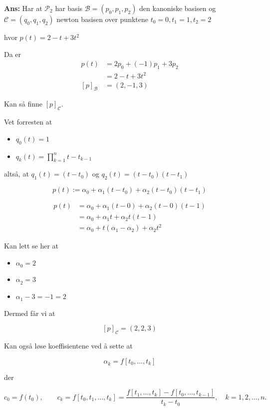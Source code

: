 \documentclass[11pt]{article}
\newenvironment{solbox}
  {\begin{mdframed}[linewidth=1pt,linecolor=black,roundcorner=5pt]
   \noindent\textbf{Ans: }\enspace}
  {\end{mdframed}}
\begin{document}
\begin{solbox}
Har at $ \mathcal{P}_2 $ har basis $ \mathcal{B} = (p_0, p_1,p_2)$ den kanoniske basisen og $ \mathcal{C}=(q_0,q_1,q_2) $ newton basisen over punktene $ t_0=0,t_1=1,t_2=2 $

hvor $ p(t)=2-t+3t^2 $ 

Da er 
\begin{align*}
    p(t) &=2p_0 + (-1)p_1+3p_2 \\
    &= 2-t+3t^2 \\
    \left[ p \right]_{\mathcal{B}} &= (2,-1,3)
\end{align*}

Kan så finne $ \left[ p \right] _{\mathcal{C}} $. 

Vet forresten at 
\begin{itemize}
  \item $ q_0(t) = 1  $
  \item $ q_k(t) = \prod_{k=1}^n t-t_{k-1} $  
\end{itemize}

altså, at $ q_1(t) = \left( t-t_0 \right)  $ og $ q_2(t) = \left( t-t_0 \right) \left( t-t_1 \right)  $ 

\[
   p(t):= \alpha_{0}^{} + \alpha_{1}^{} \left( t-t_0 \right) + \alpha_{2}^{} \left( t-t_0 \right) \left( t-t_1 \right) 
\] 

\begin{align*}
  p(t) &= \alpha_{0}^{} + \alpha_{1}^{}  \left( t-0 \right) + \alpha_{2}^{} \left( t-0 \right) \left( t-1 \right)  \\
  &= \alpha_{0}^{} + \alpha_{1}^{} t + \alpha_{2}^{} t(t-1) \\
  &= \alpha_{0}^{} + t \left( \alpha_{1}^{} - \alpha_{2}^{}  \right) + \alpha_{2}^{} t^2 
\end{align*}

Kan lett se her at 

\begin{itemize}
  \item $\alpha_{0}^{} =2$
  \item $\alpha_{2}^{} =3$
  \item $\alpha_{1}^{} - 3 =-1 = 2$
\end{itemize}

Dermed får vi at 

\[
   \left[ p \right] _{\mathcal{C}} = \left( 2,2,3 \right) 
\] 

Kan også løse koeffisientene ved å sette at 

\[
   \alpha_{k}^{} = f \left[ t_0,..., t_k \right]
\] 

der 

\[
c_0 = f(t_0),
\qquad
c_k = f[t_0, t_1, \dots, t_k]
= \frac{ f[t_1, \dots, t_k] - f[t_0, \dots, t_{k-1}] }{ t_k - t_0 }, 
\quad k=1,2,\dots,n.
\]


\end{solbox}
\end{document}
